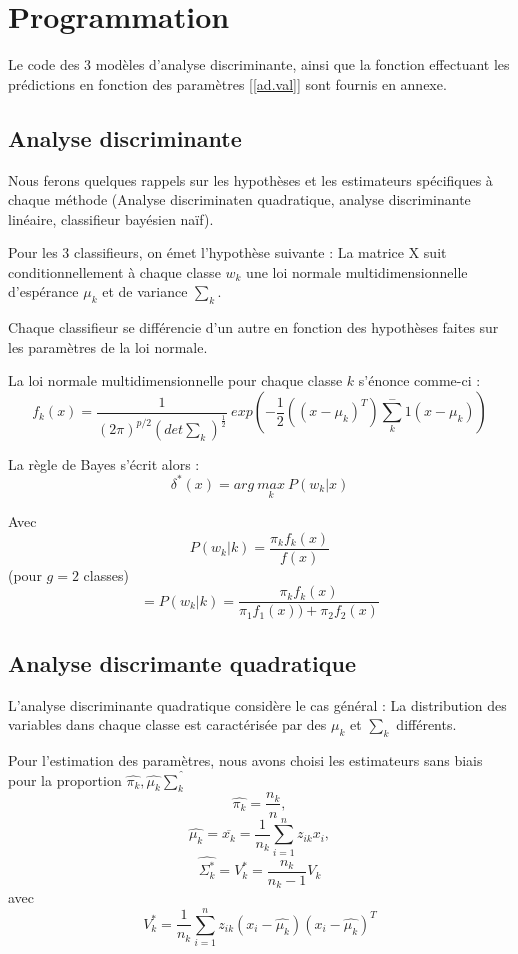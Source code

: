 \documentclass{article}
\begin{document}
\section{Programmation}

Le code des 3 modèles d'analyse discriminante, ainsi que la fonction effectuant les prédictions en fonction des paramètres [\ref{ad.val}] sont fournis en annexe.



\subsection{Analyse discriminante}
Nous ferons quelques rappels sur les hypothèses et les estimateurs spécifiques à chaque méthode (Analyse discriminaten quadratique, analyse discriminante linéaire, classifieur bayésien naïf).



Pour les 3 classifieurs, on émet l'hypothèse suivante :
La matrice X suit conditionnellement à chaque classe $w_k$ une loi normale multidimensionnelle d'espérance $\mu_k$ et de variance $\sum_k$.
\medskip

Chaque classifieur se différencie d'un autre en fonction des hypothèses faites sur les paramètres de la loi normale.

La loi normale multidimensionnelle pour chaque classe $k$ s'énonce comme-ci :
\[f_k(x)=\frac{1}{(2\pi)^{p/2}(det \sum_k)^{\frac{1}{2}}}~
exp \left( -   \frac{1}{2} ( (x-\mu_k)^T)\sum_k^-1 (x-\mu_k) \right)
\]

La règle de Bayes s'écrit alors :
\[
\delta^*(x)=arg~ \underset{k}{max}~ P(w_k|x)
\]

Avec 
\[
P(w_k|k)=\frac{\pi_k f_k(x)}{f(x)}
\]
(pour $g=2$ classes)
\[=
P(w_k|k)=\frac{\pi_k f_k(x)}{\pi_1 f_1(x)) + \pi_2 f_2(x)}
\]

\subsection{Analyse discrimante quadratique}

L'analyse discriminante quadratique considère le cas général : La distribution des variables dans chaque classe est caractérisée par des $\mu_k$ et $\sum_k$ différents.

Pour l'estimation des paramètres, nous avons choisi les estimateurs sans biais pour la proportion $ \widehat{\pi_k},  \widehat{\mu_k}  \widehat{\sum_k}  $
\[
 \widehat{\pi_k} = \frac{n_k}{n},
\]
\[
  \widehat{\mu_k} = \overline{x_k}=\frac{1}{n_k}\sum_{i=1}^{n} z_{ik}x_i,
  \]
  \[
   \widehat{\Sigma_k^*} = V_k^* = \frac{n_k}{n_k-1}V_k
\]
avec
  \[
   V_k^* = \frac{1}{n_k}\sum_{i=1}^{n} z_{ik}(x_i-\widehat{\mu_k})(x_i-\widehat{\mu_k})^T
\]
\end{document}

